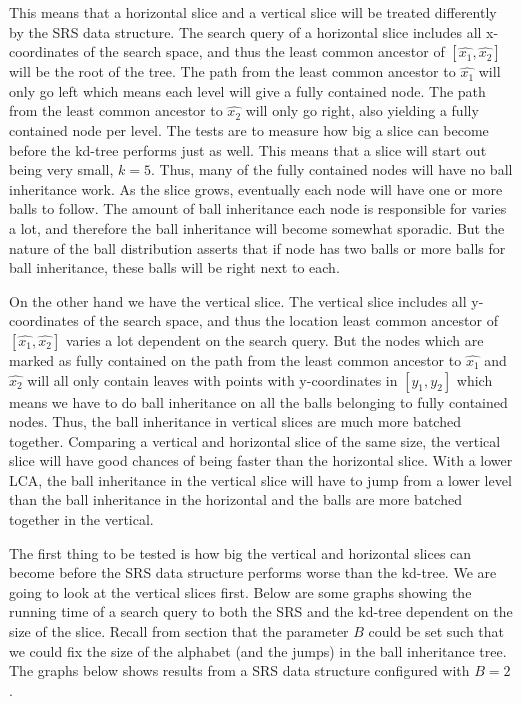 This means that a horizontal slice and a vertical slice will be treated differently by the SRS data structure. The search query of a horizontal slice includes all x-coordinates of the search space, and thus the least common ancestor of $[\hat{x_1}, \hat{x_2}]$ will be the root of the tree. The path from the least common ancestor to $\hat{x_1}$ will only go left which means each level will give a fully contained node. The path from the least common ancestor to $\hat{x_2}$ will only go right, also yielding a fully contained node per level. The tests are to measure how big a slice can become before the kd-tree performs just as well. This means that a slice will start out being very small, $k=5$. Thus, many of the fully contained nodes will have no ball inheritance work. As the slice grows, eventually each node will have one or more balls to follow. The amount of ball inheritance each node is responsible for varies a lot, and therefore the ball inheritance will become somewhat sporadic. But the nature of the ball distribution asserts that if node has two balls or more balls for ball inheritance, these balls will be right next to each.

On the other hand we have the vertical slice. The vertical slice includes all y-coordinates of the search space, and thus the location least common ancestor of $[\hat{x_1}, \hat{x_2}]$ varies a lot dependent on the search query. But the nodes which are marked as fully contained on the path from the least common ancestor to $\hat{x_1}$ and $\hat{x_2}$ will all only contain leaves with points with y-coordinates in $[y_1, y_2]$ which means we have to do ball inheritance on all the balls belonging to fully contained nodes. Thus, the ball inheritance in vertical slices are much more batched together. Comparing a vertical and horizontal slice of the same size, the vertical slice will have good chances of being faster than the horizontal slice. With a lower LCA, the ball inheritance in the vertical slice will have to jump from a lower level than the ball inheritance in the horizontal and the balls are more batched together in the vertical. 

The first thing to be tested is how big the vertical and horizontal slices can become before the SRS data structure performs worse than the kd-tree. We are going to look at the vertical slices first. Below are some graphs showing the running time of a search query to both the SRS and the kd-tree dependent on the size of the slice. Recall from section  that the parameter $B$ could be set such that we could fix the size of the alphabet (and the jumps) in the ball inheritance tree. The graphs below shows results from a SRS data structure configured with $B=2$. 


